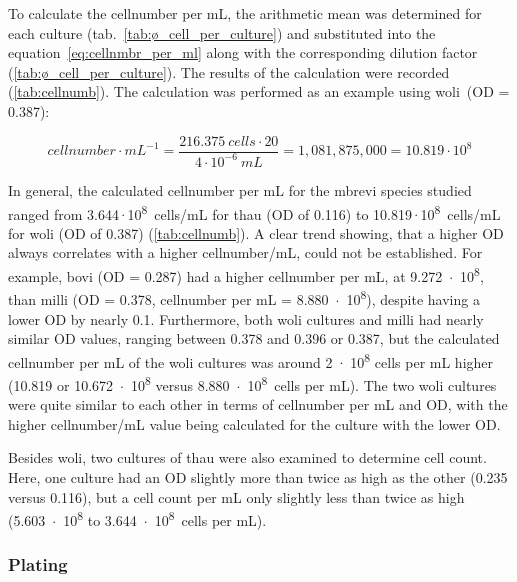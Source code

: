 To calculate the cellnumber per mL, the arithmetic mean was determined for each culture (tab.~\ref{tab:ø_cell_per_culture}) and substituted into the equation~\ref{eq:cellnmbr_per_ml} along with the corresponding dilution factor (\cref{tab:ø_cell_per_culture}). 
The results of the calculation were recorded (\cref{tab:cellnumb}). The calculation was performed as an example using \acrshort{woli}~(\acrshort{OD} = 0.387):

\begin{equation*}
	\textit{cellnumber} \cdot mL^{-1} = \frac{216.375\ \textit{cells} \cdot 20}{4 \cdot 10^{-6}\ mL} = 1,081,875,000  = 10.819 \cdot 10^{8}
	\label{eq:bsp_cellnmbr_per_ml}
\end{equation*}



In general, the calculated cellnumber per mL for the \acrlong{mbrevi} species studied ranged from 3.644\,$\cdot$\,10\textsuperscript{8}~cells/mL for \acrshort{thau} (\acrshort{OD} of 0.116) to 10.819\,$\cdot$\,10\textsuperscript{8}~cells/mL for \acrshort{woli} (\acrshort{OD} of 0.387) (\cref{tab:cellnumb}). A clear trend showing, that a higher \acrshort{OD} always correlates with a higher cellnumber/mL, could not be established. For example, \acrshort{bovi} (\acrshort{OD} = 0.287) had a higher cellnumber per mL, at 9.272~$\cdot$~10\textsuperscript{8}, than \acrshort{milli} (\acrshort{OD} = 0.378, cellnumber per mL = 8.880~$\cdot$~10\textsuperscript{8}), despite having a lower \acrshort{OD} by nearly 0.1. Furthermore, both \acrshort{woli} cultures and \acrshort{milli} had nearly similar \acrshort{OD} values, ranging between 0.378 and 0.396 or 0.387, but the calculated cellnumber per mL of the \acrshort{woli} cultures was around 2~$\cdot$~10\textsuperscript{8} cells per mL higher (10.819 or 10.672~$\cdot$~10\textsuperscript{8} versus 8.880~$\cdot$~10\textsuperscript{8}~cells per mL). The two \acrshort{woli} cultures were quite similar to each other in terms of cellnumber per mL and \acrshort{OD}, with the higher cellnumber/mL value being calculated for the culture with the lower \acrshort{OD}.

Besides \acrshort{woli}, two cultures of \acrshort{thau} were also examined to determine cell count. Here, one culture had an \acrshort{OD} slightly more than twice as high as the other (0.235 versus 0.116), but a cell count per mL only slightly less than twice as high (5.603~$\cdot$~10\textsuperscript{8} to 3.644~$\cdot$~10\textsuperscript{8}~cells per mL).
\subsubsection{Plating}

